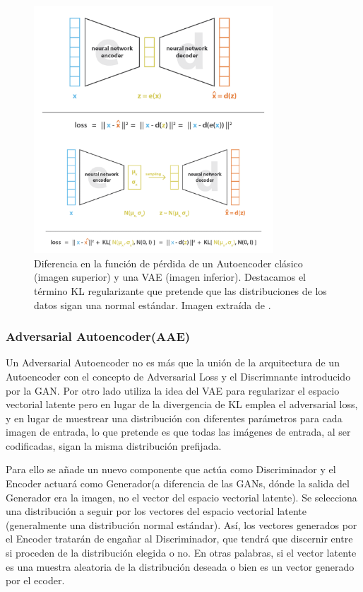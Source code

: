             \begin{figure}[!h]
                \centering
                \includegraphics[width=0.8\textwidth]{img/vae_2.png}
                \caption{Diferencia en la función de pérdida de un Autoencoder clásico (imagen superior) y una VAE (imagen inferior). Destacamos el término KL regularizante que pretende que las distribuciones de los datos sigan una normal estándar. Imagen extraída de \cite{VAE}.}
                \label{fig:VAE_2}
            \end{figure}
        
        \subsubsection{Adversarial Autoencoder(AAE)}
            \noindent Un Adversarial Autoencoder no es más que la unión de la arquitectura de un Autoencoder con el concepto de Adversarial Loss y el Discrimnante introducido por la GAN. Por otro lado utiliza la idea del VAE para regularizar el espacio vectorial latente pero en lugar de la divergencia de KL emplea el adversarial loss, y en lugar de muestrear una distribución con diferentes parámetros para cada imagen de entrada, lo que pretende es que todas las imágenes de entrada, al ser codificadas, sigan la misma distribución prefijada.

            \medskip

            \noindent Para ello se añade un nuevo componente que actúa como Discriminador y el Encoder actuará como Generador(a diferencia de las GANs, dónde la salida del Generador era la imagen, no el vector del espacio vectorial latente). Se selecciona una distribución a seguir por los vectores del espacio vectorial latente (generalmente una distribución normal estándar). Así, los vectores generados por el Encoder tratarán de engañar al Discriminador, que tendrá que discernir entre si proceden de la distribución elegida o no. En otras palabras, si el vector latente es una muestra aleatoria de la distribución deseada o bien es un vector generado por el ecoder.

